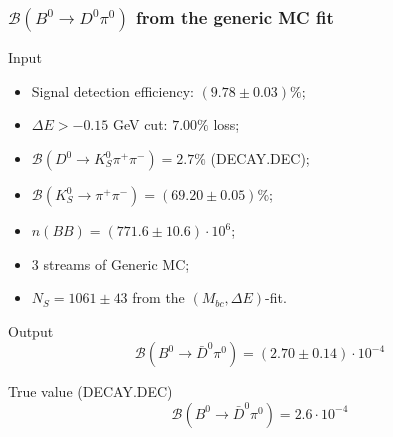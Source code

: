 \documentclass[10 pt,compress,mathserif]{beamer}
\newcommand{\dkspp}{\ensuremath{D^0\to K_S^0\pi^+\pi^-}\xspace}
\newcommand{\bdpi}{\ensuremath{B^0\to \bar D^0\pi^0}\xspace}
\begin{document}
\begin{frame}
\end{frame}

\begin{frame}
 \frametitle{$\mathcal{B}\left(B^0\to D^0\pi^0\right)$ from the generic MC fit}
 \begin{block}{Input}
  \begin{itemize}
  \item Signal detection efficiency: $(9.78\pm0.03)\%$;
  \item $\Delta E>-0.15$ GeV cut: $7.00\%$ loss;
  \item $\mathcal{B}(\dkspp) = 2.7\%$ (DECAY.DEC);
  \item $\mathcal{B}(K_S^0\to\pi^+\pi^-) = (69.20\pm0.05)\%$;
  \item $n(BB) = (771.6\pm10.6)\cdot 10^6$;
  \item $3$ streams of Generic MC;
  \item $N_S=1061\pm43$ from the $(M_{bc},\Delta E)$-fit.
 \end{itemize}
 \end{block}

 \begin{block}{Output}
 \begin{equation*}
  \mathcal{B}\left(\bdpi\right) = (2.70\pm0.14)\cdot 10^{-4}
 \end{equation*}
 \end{block}
 

 \begin{block}{True value (DECAY.DEC)}
 \begin{equation*}
  \mathcal{B}\left(\bdpi\right) = 2.6\cdot 10^{-4}
 \end{equation*}
 \end{block}
\end{frame}
\end{document}
